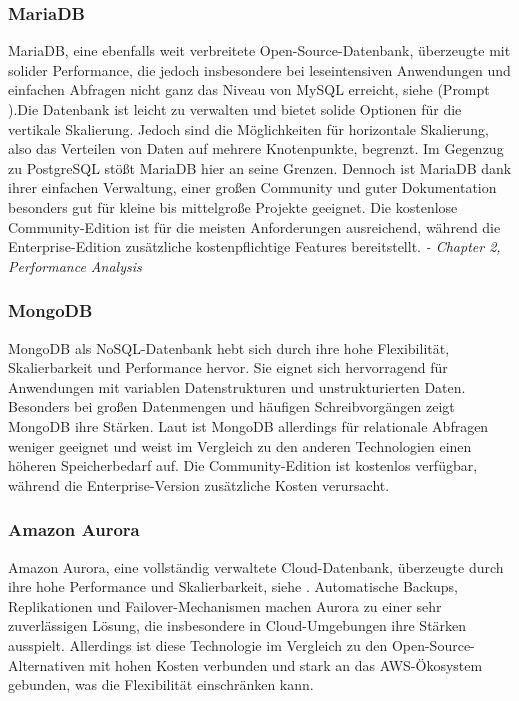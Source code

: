\subsubsection{MariaDB}
MariaDB, eine ebenfalls weit verbreitete Open-Source-Datenbank, überzeugte mit solider Performance, die jedoch insbesondere bei leseintensiven Anwendungen und einfachen Abfragen nicht ganz das Niveau von MySQL erreicht, siehe \cite{Paper:performanceComparisonMySQL}(Prompt \cite{ChatGPT:rewrite3}).Die Datenbank ist leicht zu verwalten und bietet solide Optionen für die vertikale Skalierung. Jedoch sind die Möglichkeiten für horizontale Skalierung, also das Verteilen von Daten auf mehrere Knotenpunkte, begrenzt. Im Gegenzug zu PostgreSQL stößt MariaDB hier an seine Grenzen. Dennoch ist MariaDB dank ihrer einfachen Verwaltung, einer großen Community und guter Dokumentation besonders gut für kleine bis mittelgroße Projekte geeignet. Die kostenlose Community-Edition ist für die meisten Anforderungen ausreichend, während die Enterprise-Edition zusätzliche kostenpflichtige Features bereitstellt. \textit{\cite{Buch:PierreMavro} - Chapter 2, Performance Analysis}

\subsubsection{MongoDB}
MongoDB als NoSQL-Datenbank hebt sich durch ihre hohe Flexibilität, Skalierbarkeit und Performance hervor. Sie eignet sich hervorragend für Anwendungen mit variablen Datenstrukturen und unstrukturierten Daten. Besonders bei großen Datenmengen und häufigen Schreibvorgängen zeigt MongoDB ihre Stärken. Laut \cite{Paper:performanceComparison} ist MongoDB allerdings für relationale Abfragen weniger geeignet und weist im Vergleich zu den anderen Technologien einen höheren Speicherbedarf auf. Die Community-Edition ist kostenlos verfügbar, während die Enterprise-Version zusätzliche Kosten verursacht. 

\subsubsection{Amazon Aurora}
Amazon Aurora, eine vollständig verwaltete Cloud-Datenbank, überzeugte durch ihre hohe Performance und Skalierbarkeit, siehe \cite{Amazon:aurora}. Automatische Backups, Replikationen und Failover-Mechanismen machen Aurora zu einer sehr zuverlässigen Lösung, die insbesondere in Cloud-Umgebungen ihre Stärken ausspielt. Allerdings ist diese Technologie im Vergleich zu den Open-Source-Alternativen mit hohen Kosten verbunden und stark an das AWS-Ökosystem gebunden, was die Flexibilität einschränken kann. 


